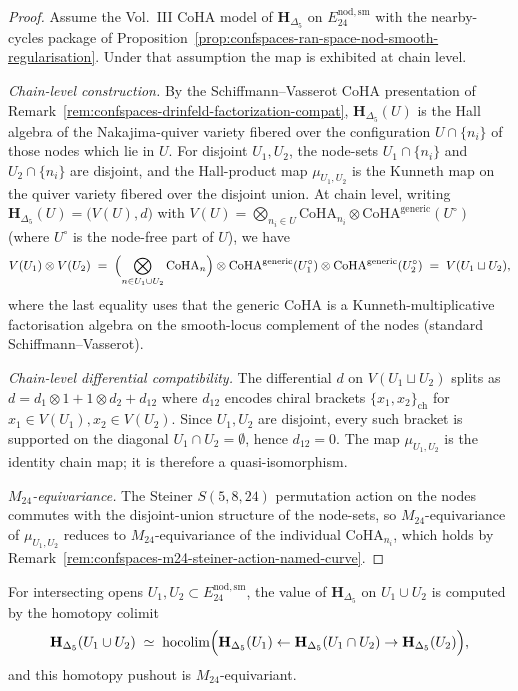 \begin{proof}
Assume the Vol.~III CoHA model of $\mathbf H_{\Delta_5}$ on
$E^{\mathrm{nod,sm}}_{24}$ with the nearby-cycles package of
Proposition~\ref{prop:confspaces-ran-space-nod-smooth-regularisation}.
Under that assumption the map is exhibited at chain level.

\emph{Chain-level construction.} By the Schiffmann--Vasserot CoHA
presentation of Remark~\ref{rem:confspaces-drinfeld-factorization-compat},
$\mathbf{H}_{\Delta_5}(U)$ is the Hall algebra of the Nakajima-quiver
variety fibered over the configuration $U\cap\{n_i\}$ of those nodes
which lie in $U$. For disjoint $U_1, U_2$, the node-sets
$U_1\cap\{n_i\}$ and $U_2\cap\{n_i\}$ are disjoint, and the
Hall-product map $\mu_{U_1,U_2}$ is the Kunneth map on the quiver
variety fibered over the disjoint union. At chain level, writing
$\mathbf{H}_{\Delta_5}(U) = \bigl(V(U),d\bigr)$ with
$V(U) = \bigotimes_{n_i\in U}\mathrm{CoHA}_{n_i}\otimes
\mathrm{CoHA}^{\mathrm{generic}}(U^\circ)$ (where $U^\circ$ is the
node-free part of $U$), we have
\[
 V(U_1)\otimes V(U_2)
 \;=\;
 \Bigl(\bigotimes_{n\in U_1\cup U_2}\mathrm{CoHA}_n\Bigr)
 \otimes
 \mathrm{CoHA}^{\mathrm{generic}}(U_1^\circ)
 \otimes
 \mathrm{CoHA}^{\mathrm{generic}}(U_2^\circ)
 \;=\;
 V(U_1\sqcup U_2),
\]
where the last equality uses that the generic CoHA is a
Kunneth-multiplicative factorisation algebra on the smooth-locus
complement of the nodes (standard Schiffmann--Vasserot).

\emph{Chain-level differential compatibility.} The differential $d$ on
$V(U_1\sqcup U_2)$ splits as $d = d_1\otimes 1 + 1\otimes d_2 + d_{12}$
where $d_{12}$ encodes chiral brackets $\{x_1,x_2\}_{\mathrm{ch}}$ for
$x_1\in V(U_1),x_2\in V(U_2)$. Since $U_1,U_2$ are disjoint, every such
bracket is supported on the diagonal $U_1\cap U_2 = \emptyset$, hence
$d_{12} = 0$. The map $\mu_{U_1,U_2}$ is the identity chain map; it is
therefore a quasi-isomorphism.

\emph{$M_{24}$-equivariance.} The Steiner $S(5,8,24)$ permutation
action on the nodes commutes with the disjoint-union structure of the
node-sets, so $M_{24}$-equivariance of $\mu_{U_1,U_2}$ reduces to
$M_{24}$-equivariance of the individual $\mathrm{CoHA}_{n_i}$, which
holds by Remark~\ref{rem:confspaces-m24-steiner-action-named-curve}.
\end{proof}

\begin{theorem}
\label{thm:confspaces-locality-homotopy-colimit}
\ClaimStatusConditional
For intersecting opens $U_1, U_2 \subset E^{\mathrm{nod,sm}}_{24}$, the
value of $\mathbf{H}_{\Delta_5}$ on $U_1 \cup U_2$ is computed by the
homotopy colimit
\begin{equation}
\label{eq:confspaces-locality-hocolim}
 \mathbf{H}_{\Delta_5}(U_1\cup U_2)
 \;\simeq\;
 \mathrm{hocolim}\Bigl(\mathbf{H}_{\Delta_5}(U_1)
 \leftarrow \mathbf{H}_{\Delta_5}(U_1\cap U_2)
 \rightarrow \mathbf{H}_{\Delta_5}(U_2)\Bigr),
\end{equation}
and this homotopy pushout is $M_{24}$-equivariant.
\end{theorem}

